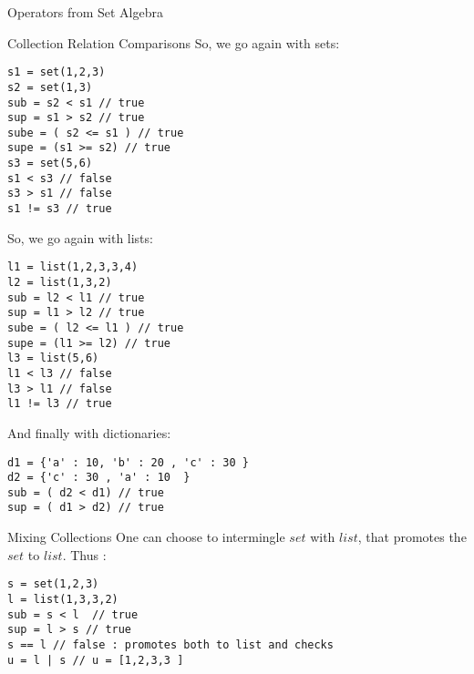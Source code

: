 \begin{section}{Operators from Set Algebra}
\begin{subsection}{Collection Relation Comparisons}
So, we go again with sets:

\begin{center}\begin{minipage}{\linewidth}
\begin{lstlisting}[style=JexlStyle]
s1 = set(1,2,3)
s2 = set(1,3)
sub = s2 < s1 // true  
sup = s1 > s2 // true 
sube = ( s2 <= s1 ) // true  
supe = (s1 >= s2) // true 
s3 = set(5,6)
s1 < s3 // false 
s3 > s1 // false 
s1 != s3 // true
\end{lstlisting}
\end{minipage}\end{center}

So, we go again with lists:

\begin{center}\begin{minipage}{\linewidth}
\begin{lstlisting}[style=JexlStyle]
l1 = list(1,2,3,3,4)
l2 = list(1,3,2)
sub = l2 < l1 // true  
sup = l1 > l2 // true 
sube = ( l2 <= l1 ) // true  
supe = (l1 >= l2) // true 
l3 = list(5,6)
l1 < l3 // false 
l3 > l1 // false 
l1 != l3 // true
\end{lstlisting}
\end{minipage}\end{center}


And finally with dictionaries:

\begin{center}\begin{minipage}{\linewidth}
\begin{lstlisting}[style=JexlStyle]
d1 = {'a' : 10, 'b' : 20 , 'c' : 30 }
d2 = {'c' : 30 , 'a' : 10  }
sub = ( d2 < d1) // true 
sup = ( d1 > d2) // true
\end{lstlisting}
\end{minipage}\end{center}

\end{subsection}


\begin{subsection}{Mixing Collections}
One can choose to intermingle $set$ with $list$, that promotes the $set$ to $list$.
Thus :

\begin{center}\begin{minipage}{\linewidth}
\begin{lstlisting}[style=JexlStyle]
s = set(1,2,3)
l = list(1,3,3,2)
sub = s < l  // true  
sup = l > s // true 
s == l // false : promotes both to list and checks
u = l | s // u = [1,2,3,3 ]
\end{lstlisting}
\end{minipage}\end{center}


\end{subsection}
\end{section}
